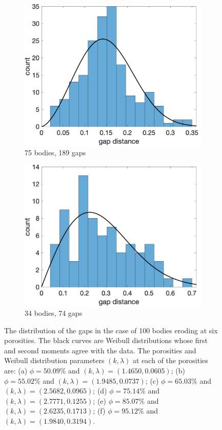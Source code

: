\documentclass[preprint,10pt]{elsarticle}
\begin{document}
\begin{figure}[H]
\begin{subfigure}[b]{0.3\textwidth}
\includegraphics*[width =\linewidth]{./figs/hist100b_207}
\caption{75 bodies, 189 gaps}
\end{subfigure}%
\begin{subfigure}[b]{0.3\textwidth}
\includegraphics*[width =\linewidth]{./figs/hist100b_246}
\caption{34 bodies, 74 gaps}
\end{subfigure}
\caption{\label{fig:Eroding100gap_hist} The distribution of the gaps in
the case of 100 bodies eroding at six porosities. The black curves are
Weibull distributions whose first and second moments agree with the
data. The porosities and Weibull distribution parameters $(k,\lambda)$
at each of the porosities are: (a) $\phi = 50.09\%$ and
$(k,\lambda)=(1.4650,0.0605)$; (b) $\phi = 55.02\%$ and
$(k,\lambda)=(1.9485,0.0737)$; (c) $\phi = 65.03\%$ and
$(k,\lambda)=(2.5682,0.0965)$; (d) $\phi = 75.14\%$ and
$(k,\lambda)=(2.7771,0.1255)$; (e) $\phi = 85.07\%$ and
$(k,\lambda)=(2.6235,0.1713)$; (f) $\phi = 95.12\%$ and
$(k,\lambda)=(1.9840, 0.3194)$.}
\end{figure}
\end{document}
